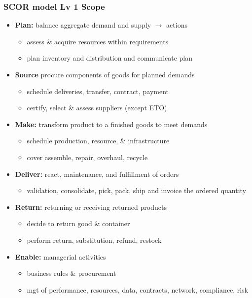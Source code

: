 \documentclass[10pt,handout,notes=show]{beamer}
\begin{document}
\begin{frame}
  \frametitle{SCOR model Lv 1 Scope}

    \begin{itemize}
    \item \textbf{Plan:} balance aggregate demand and supply $\rightarrow$ actions
    \begin{itemize}
      \item assess \& acquire \alert{resources} within requirements
      \item plan inventory and distribution and communicate plan
    \end{itemize}
    \item \textbf{Source} procure components of goods for planned demands
    \begin{itemize}
      \item \alert{schedule} deliveries, transfer, contract, payment
      \item certify, select \& assess suppliers (except ETO)
    \end{itemize}
    \item \textbf{Make:} transform product to a finished goods to meet demands
    \begin{itemize}
      \item schedule production, resource, \& infrastructure
      \item cover assemble, repair, overhaul, recycle
    \end{itemize}
    \item \textbf{Deliver:} react, maintenance, and fulfillment of orders
    \begin{itemize}
      \item validation, consolidate, pick, pack, ship and invoice the ordered quantity
    \end{itemize}
    \item \textbf{Return:} returning or receiving returned products
    \begin{itemize}
      \item decide to return good \& container
      \item perform return, substitution, refund, restock
    \end{itemize}
    \item \textbf{Enable:} managerial activities
    \begin{itemize}
      \item business rules \& procurement
      \item mgt of performance, resources, data, contracts, network, compliance, risk
    \end{itemize}
  \end{itemize}


\end{frame}
\end{document}
